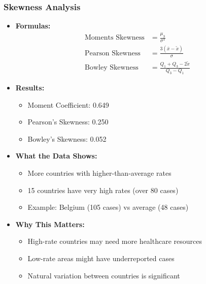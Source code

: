\begin{frame}
    \frametitle{Skewness Analysis}
    \begin{itemize}
        \item \textbf{Formulas:}
        \[
        \begin{aligned}
        \text{Moments Skewness} &= \frac{\mu_3}{\sigma^3} \\
        \text{Pearson Skewness} &= \frac{3(\bar{x} - \tilde{x})}{\sigma} \\
        \text{Bowley Skewness} &= \frac{Q_1 + Q_3 - 2\tilde{x}}{Q_3 - Q_1}
        \end{aligned}
        \]
        
        \item \textbf{Results:}
        \begin{itemize}
            \item Moment Coefficient: 0.649
            \item Pearson's Skewness: 0.250
            \item Bowley's Skewness: 0.052
        \end{itemize}
    \end{itemize}
\end{frame}

\begin{frame}
    \begin{itemize}
        \item \textbf{What the Data Shows:}
        \begin{itemize}
            \item More countries with higher-than-average rates
            \item 15 countries have very high rates (over 80 cases)
            \item Example: Belgium (105 cases) vs average (48 cases)
        \end{itemize}
        
        \item \textbf{Why This Matters:}
        \begin{itemize}
            \item High-rate countries may need more healthcare resources
            \item Low-rate areas might have underreported cases
            \item Natural variation between countries is significant
        \end{itemize}
    \end{itemize}
\end{frame}

